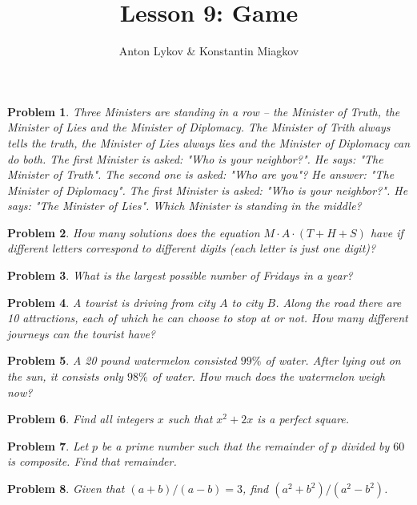 \documentclass[a4paper,12pt]{article}
\author{Anton Lykov \& Konstantin Miagkov}
\title{Lesson 9: Game}
\theoremstyle{perfect}
\newtheorem{prb}{Problem}
\begin{document}
 
\setlength{\parindent}{0cm}
\maketitle

\begin{prb}
Three Ministers are standing in a row -- the Minister of Truth, the Minister of Lies and the Minister of Diplomacy. The Minister of Trith always tells the truth, the Minister of Lies always lies and the Minister of Diplomacy can do both. The first Minister is asked: "Who is your neighbor?". He says: "The Minister of Truth". The second one is asked: "Who are you"? He answer: "The Minister of Diplomacy".  The first Minister is asked: "Who is your neighbor?". He says: "The Minister of Lies". Which Minister is standing in the middle?
\end{prb}


\begin{prb}
How many solutions does the equation $M\cdot A \cdot (T + H + S)$ have if different letters correspond to different digits (each letter is just one digit)?
\end{prb}

\begin{prb}
What is the largest possible number of Fridays in a year?
\end{prb}

\begin{prb}
A tourist is driving from city $A$ to city $B$. Along the road there are 10 attractions, each of which he can choose to stop at or not. How many different journeys can the tourist have?
\end{prb}

\begin{prb}
A 20 pound watermelon consisted $99\%$ of water. After lying out on the sun, it consists only $98\%$ of water. How much does the watermelon weigh now?
\end{prb}

\begin{prb}
Find all integers $x$ such that $x^2+2x$ is a perfect square.
\end{prb}



\begin{prb}
Let $p$ be a prime number such that the remainder of $p$ divided by $60$ is composite. Find that remainder.
\end{prb}

\begin{prb}
Given that $(a+b)/(a-b)=3$, find $(a^2+b^2)/(a^2-b^2)$.
\end{prb}
\end{document}
